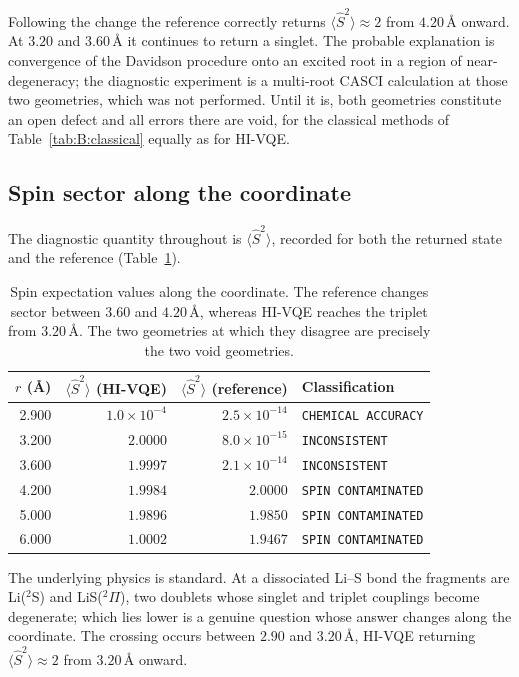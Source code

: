 \documentclass[11pt,a4paper]{article}
\newcommand{\Ang}{\ensuremath{\,\text{\AA}}}
\newcommand{\Ssq}{\ensuremath{\langle \hat{S}^2 \rangle}}
\newcommand{\code}[1]{\texttt{\small #1}}
\begin{document}
\begin{caution}
Following the change the reference correctly returns $\Ssq \approx 2$ from
$4.20\Ang$ onward. At $3.20$ and $3.60\Ang$ it continues to return a singlet.
The probable explanation is convergence of the Davidson procedure onto an
excited root in a region of near-degeneracy; the diagnostic experiment is a
multi-root CASCI calculation at those two geometries, which was not performed.
Until it is, both geometries constitute an open defect and all errors there are
void, for the classical methods of Table~\ref{tab:B:classical} equally as for
HI-VQE.
\end{caution}

\subsection{Spin sector along the coordinate}
\label{sec:B:sector}

The diagnostic quantity throughout is $\Ssq$, recorded for both the returned
state and the reference (Table~\ref{tab:B:spin}).

\begin{table}[htbp]
\centering
\small
\caption{Spin expectation values along the coordinate. The reference changes
sector between $3.60$ and $4.20\Ang$, whereas HI-VQE reaches the triplet from
$3.20\Ang$. The two geometries at which they disagree are precisely the two
void geometries.}
\label{tab:B:spin}
\begin{tabular}{@{}rrrl@{}}
\toprule
$r$ (\AA) & $\Ssq$ (HI-VQE) & $\Ssq$ (reference) & Classification \\
\midrule
2.900 & $1.0\times10^{-4}$ & $2.5\times10^{-14}$ & \code{CHEMICAL ACCURACY} \\
3.200 & $2.0000$           & $8.0\times10^{-15}$ & \code{INCONSISTENT} \\
3.600 & $1.9997$           & $2.1\times10^{-14}$ & \code{INCONSISTENT} \\
4.200 & $1.9984$           & $2.0000$            & \code{SPIN CONTAMINATED} \\
5.000 & $1.9896$           & $1.9850$            & \code{SPIN CONTAMINATED} \\
6.000 & $1.0002$           & $1.9467$            & \code{SPIN CONTAMINATED} \\
\bottomrule
\end{tabular}
\end{table}

The underlying physics is standard. At a dissociated Li--S bond the fragments
are Li($^2$S) and LiS($^2\Pi$), two doublets whose singlet and triplet
couplings become degenerate; which lies lower is a genuine question whose
answer changes along the coordinate. The crossing occurs between $2.90$ and
$3.20\Ang$, HI-VQE returning $\Ssq \approx 2$ from $3.20\Ang$ onward.
\end{document}

